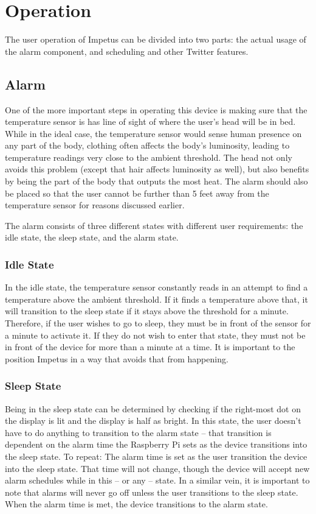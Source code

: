 \chapter{Operation}
The user operation of Impetus can be divided into two parts: the
actual usage of the alarm component, and scheduling and other Twitter
features.

\section{Alarm}
One of the more important steps in operating this device is making
sure that the temperature sensor is has line of sight of where the
user's head will be in bed. While in the ideal case, the temperature
sensor would sense human presence on any part of the body, clothing
often affects the body's luminosity, leading to temperature readings
very close to the ambient threshold. The head not only avoids this
problem (except that hair affects luminosity as well), but also
benefits by being the part of the body that outputs the most heat. The
alarm should also be placed so that the user cannot be further than 5
feet away from the temperature sensor for reasons discussed earlier.

The alarm consists of three different states with different user
requirements: the idle state, the sleep state, and the alarm state.

\subsection{Idle State}
In the idle state, the temperature sensor constantly reads in an
attempt to find a temperature above the ambient threshold. If it finds
a temperature above that, it will transition to the sleep state if it
stays above the threshold for a minute. Therefore, if the user wishes
to go to sleep, they must be in front of the sensor for a minute to
activate it. If they do not wish to enter that state, they must not be
in front of the device for more than a minute at a time. It is
important to the position Impetus in a way that avoids that from
happening.

\subsection{Sleep State}
Being in the sleep state can be determined by checking if the
right-most dot on the display is lit and the display is half as
bright. In this state, the user doesn't have to do anything to
transition to the alarm state -- that transition is dependent on the
alarm time the Raspberry Pi sets as the device transitions into the
sleep state. To repeat: The alarm time is set as the user transition
the device into the sleep state. That time will not change, though the
device will accept new alarm schedules while in this -- or any --
state. In a similar vein, it is important to note that alarms will
never go off unless the user transitions to the sleep state. When the
alarm time is met, the device transitions to the alarm state.

